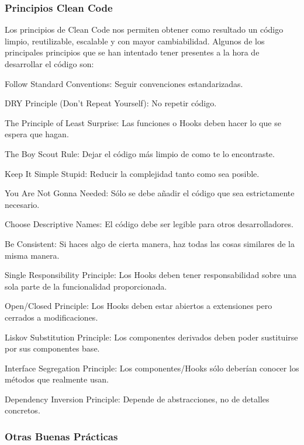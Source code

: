 \documentclass[12pt,twoside,titlepage]{report}
\begin{document}
\subsubsection{Principios Clean Code}

Los principios de Clean Code nos permiten obtener como resultado un código limpio, reutilizable, escalable y con mayor cambiabilidad. Algunos de los principales principios que se han intentado tener presentes a la hora de desarrollar el código son:

\begin{compactitem}
    \item Follow Standard Conventions: Seguir convenciones estandarizadas.
    \item DRY Principle (Don't Repeat Yourself): No repetir código.
    \item The Principle of Least Surprise: Las funciones o Hooks deben hacer lo que se espera que hagan.
    \item The Boy Scout Rule: Dejar el código más limpio de como te lo encontraste.
    \item Keep It Simple Stupid: Reducir la complejidad tanto como sea posible.
    \item You Are Not Gonna Needed: Sólo se debe añadir el código que sea estrictamente necesario.
    \item Choose Descriptive Names: El código debe ser legible para otros desarrolladores.
    \item Be Consistent: Si haces algo de cierta manera, haz todas las cosas similares de la misma manera.
    \item Single Responsibility Principle: Los Hooks deben tener responsabilidad sobre una sola parte de la funcionalidad proporcionada.
    \item Open/Closed Principle: Los Hooks deben estar abiertos a extensiones pero cerrados a modificaciones.
    \item Liskov Substitution Principle: Los componentes derivados deben poder sustituirse por sus componentes base.
    \item Interface Segregation Principle: Los componentes/Hooks sólo deberían conocer los métodos que realmente usan.
    \item Dependency Inversion Principle: Depende de abstracciones, no de detalles concretos.
\end{compactitem}

\subsubsection{Otras Buenas Prácticas}
\end{document}
